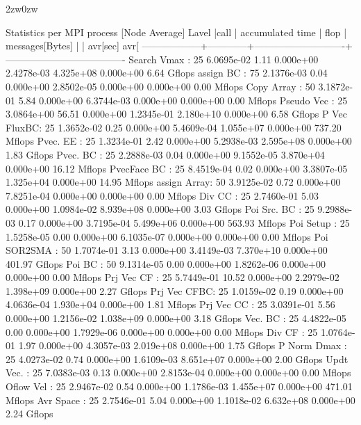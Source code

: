 \begin{indentation}{2zw}{0zw}
{\begin{program}
Statistics per MPI process [Node Average]
Lavel       |call |             accumulated time            |       flop | messages[Bytes]
            |     |   avr[sec]  avr[%
------------------+------------+----------------------------+-------------------------------------
Search Vmax :  25   6.0695e-02   1.11  0.000e+00  2.4278e-03   4.325e+08  0.000e+00    6.64 Gflops
assign BC   :  75   2.1376e-03   0.04  0.000e+00  2.8502e-05   0.000e+00  0.000e+00    0.00 Mflops
Copy Array  :  50   3.1872e-01   5.84  0.000e+00  6.3744e-03   0.000e+00  0.000e+00    0.00 Mflops
Pseudo Vec  :  25   3.0864e+00  56.51  0.000e+00  1.2345e-01   2.180e+10  0.000e+00    6.58 Gflops
P Vec FluxBC:  25   1.3652e-02   0.25  0.000e+00  5.4609e-04   1.055e+07  0.000e+00  737.20 Mflops
Pvec. EE    :  25   1.3234e-01   2.42  0.000e+00  5.2938e-03   2.595e+08  0.000e+00    1.83 Gflops
Pvec. BC    :  25   2.2888e-03   0.04  0.000e+00  9.1552e-05   3.870e+04  0.000e+00   16.12 Mflops
PvecFace BC :  25   8.4519e-04   0.02  0.000e+00  3.3807e-05   1.325e+04  0.000e+00   14.95 Mflops
assign Array:  50   3.9125e-02   0.72  0.000e+00  7.8251e-04   0.000e+00  0.000e+00    0.00 Mflops
Div CC      :  25   2.7460e-01   5.03  0.000e+00  1.0984e-02   8.939e+08  0.000e+00    3.03 Gflops
Poi Src. BC :  25   9.2988e-03   0.17  0.000e+00  3.7195e-04   5.499e+06  0.000e+00  563.93 Mflops
Poi Setup   :  25   1.5258e-05   0.00  0.000e+00  6.1035e-07   0.000e+00  0.000e+00    0.00 Mflops
Poi SOR2SMA :  50   1.7074e-01   3.13  0.000e+00  3.4149e-03   7.370e+10  0.000e+00  401.97 Gflops
Poi BC      :  50   9.1314e-05   0.00  0.000e+00  1.8262e-06   0.000e+00  0.000e+00    0.00 Mflops
Prj Vec CF  :  25   5.7449e-01  10.52  0.000e+00  2.2979e-02   1.398e+09  0.000e+00    2.27 Gflops
Prj Vec CFBC:  25   1.0159e-02   0.19  0.000e+00  4.0636e-04   1.930e+04  0.000e+00    1.81 Mflops
Prj Vec CC  :  25   3.0391e-01   5.56  0.000e+00  1.2156e-02   1.038e+09  0.000e+00    3.18 Gflops
Vec. BC     :  25   4.4822e-05   0.00  0.000e+00  1.7929e-06   0.000e+00  0.000e+00    0.00 Mflops
Div CF      :  25   1.0764e-01   1.97  0.000e+00  4.3057e-03   2.019e+08  0.000e+00    1.75 Gflops
P Norm Dmax :  25   4.0273e-02   0.74  0.000e+00  1.6109e-03   8.651e+07  0.000e+00    2.00 Gflops
Updt Vec.   :  25   7.0383e-03   0.13  0.000e+00  2.8153e-04   0.000e+00  0.000e+00    0.00 Mflops
Oflow Vel   :  25   2.9467e-02   0.54  0.000e+00  1.1786e-03   1.455e+07  0.000e+00  471.01 Mflops
Avr Space   :  25   2.7546e-01   5.04  0.000e+00  1.1018e-02   6.632e+08  0.000e+00    2.24 Gflops

\end{program}}
\end{indentation}
